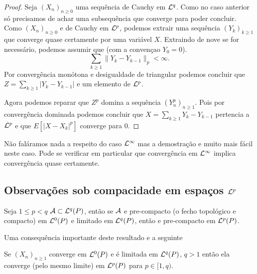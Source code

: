 \begin{topics}
\begin{theorem}
\end{theorem}

 \begin{proof}
 Seja $(X_n)_{n\ge 0}$ uma sequência de Cauchy em ${\mathcal L}^q$. 
  Como no caso anterior só precisamos de achar uma subsequência que converge para poder concluir.
 Como $(X_n)_{n\ge 0}$ e de Cauchy em ${\mathcal L}^p$, podemos extrair uma sequência $(Y_k)_{k\ge 1}$ que converge quase certamente por uma variável $X$.
 Extraindo de nove se for necessário, podemos assumir que  (com a convençao $Y_0=0$).
   $$\sum_{k\ge 1} \| Y_k-Y_{k-1} \|_{p}<\infty.$$
    Por convergência monótona e desigualdade de triangular podemos concluir que 
 $Z=\sum_{k\ge 1} |Y_k-Y_{k-1}|$ e um elemento de ${\mathcal L}^p$.
 
 \medskip
 
 Agora podemos reparar que $Z^p$ domina a sequência $(Y^p_n)_{n\ge 1}$. 
 Pois por convergência dominada podemos concluir que  $X=\sum_{k\ge 1} Y_k-Y_{k-1}$ pertencia a ${\mathcal L}^p$ e que $E[|X-X_k|^p]$ converge para $0$.
 \end{proof}

 \begin{remark}
  Não faláramos nada a respeito do caso ${\mathcal L}^{\infty}$  mas a demostração e muito mais fácil neste caso.
  Pode se verificar em particular que convergência em ${\mathcal L}^{\infty}$ implica convergência quase certamente.
 \end{remark}


\subsection{Observações sob compacidade em espaços ${\mathcal L}^p$}

\begin{proposition}\label{prop:laug}
 Seja $1 \le p<q$  ${\mathcal A}\subset {\ensuremath{\mathcal L}}^q(P)$, então se ${\mathcal A}$ e pre-compacto (o fecho topológico e compacto) em ${\mathcal L}^0(P)$ e 
 limitado em ${\mathcal L}^q(P)$, então e pre-compacto em ${\mathcal L}^p(P)$.
 \end{proposition}
Uma consequência importante deste resultado e a seguinte
\begin{corollary}
 Se $(X_n)_{n\ge 1}$ converge em ${\mathcal L}^0(P)$ e é limitada em ${\mathcal L}^q(P)$, $q>1$ então 
ela converge (pelo mesmo limite) em ${\mathcal L}^p(P)$ para $p\in [1,q)$.
 \end{corollary}



\end{topics}

